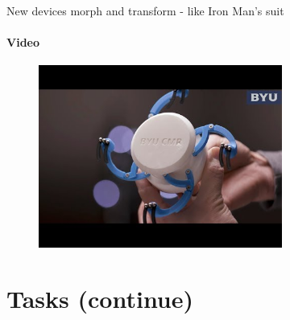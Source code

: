 \documentclass[aspectratio=169]{beamer}
\begin{document}
\begin{frame}[t]{New devices morph and transform - like Iron Man's suit}
    \framesubtitle{Video}
    \vspace*{-0.6cm}
        \begin{figure}[H]
            \href{http://www.youtube.com/watch?v=CdPLzA4xIF0}{\centering\includegraphics[height=6cm,keepaspectratio]{image20.jpg}}
            \label{fig:image20}
        \end{figure}
    \end{frame}

\section*{Tasks (continue)}
\end{document}

